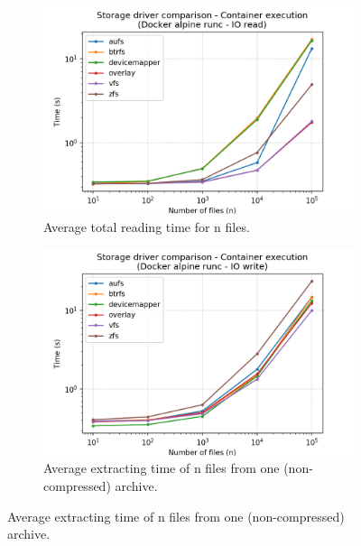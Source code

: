 \begin{figure}[!h]
    
    \begin{subfigure}{.5\textwidth}
      \centering
      \includegraphics[width=\linewidth]{images/storage-driver/storage-driver-execution-Docker-alpine-runc---IO-read.png}
      \caption{Average total reading time for n files.}
      \label{fig:storage-driver:runc:io-read-exec}
    \end{subfigure}
    \begin{subfigure}{.5\textwidth}
      \centering
      \includegraphics[width=\linewidth]{images/storage-driver/storage-driver-execution-Docker-alpine-runc---IO-write.png}
      \caption{Average extracting time of n files from one (non-compressed) archive.}
      \label{fig:storage-driver:runc:io-write-exec}
    \end{subfigure}
    

\end{figure}
